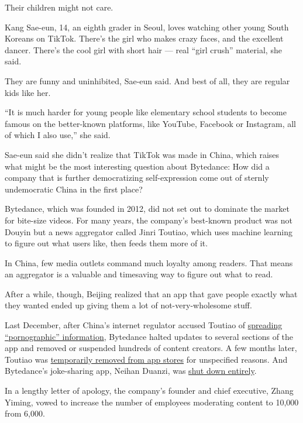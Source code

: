 Their children might not care.

Kang Sae-eun, 14, an eighth grader in Seoul, loves watching other young
South Koreans on TikTok. There's the girl who makes crazy faces, and the
excellent dancer. There's the cool girl with short hair --- real ``girl
crush'' material, she said.

They are funny and uninhibited, Sae-eun said. And best of all, they are
regular kids like her.

``It is much harder for young people like elementary school students to
become famous on the better-known platforms, like YouTube, Facebook or
Instagram, all of which I also use,'' she said.

Sae-eun said she didn't realize that TikTok was made in China, which
raises what might be the most interesting question about Bytedance: How
did a company that is further democratizing self-expression come out of
sternly undemocratic China in the first place?

Bytedance, which was founded in 2012, did not set out to dominate the
market for bite-size videos. For many years, the company's best-known
product was not Douyin but a news aggregator called Jinri Toutiao, which
uses machine learning to figure out what users like, then feeds them
more of it.

In China, few media outlets command much loyalty among readers. That
means an aggregator is a valuable and timesaving way to figure out what
to read.

After a while, though, Beijing realized that an app that gave people
exactly what they wanted ended up giving them a lot of
not-very-wholesome stuff.

Last December, after China's internet regulator accused Toutiao of
\href{https://www.nytimes3xbfgragh.onion/2018/01/02/business/china-toutiao-censorship.html}{spreading
``pornographic'' information}, Bytedance halted updates to several
sections of the app and removed or suspended hundreds of content
creators. A few months later, Toutiao was
\href{https://www.nytimes3xbfgragh.onion/2018/04/11/technology/china-toutiao-bytedance-censor.html}{temporarily
removed from app stores} for unspecified reasons. And Bytedance's
joke-sharing app, Neihan Duanzi, was
\href{https://www.nytimes3xbfgragh.onion/2018/04/12/business/china-bytedance-duanzi-censor.html}{shut
down entirely}.

In a lengthy letter of apology, the company's founder and chief
executive, Zhang Yiming, vowed to increase the number of employees
moderating content to 10,000 from 6,000.

